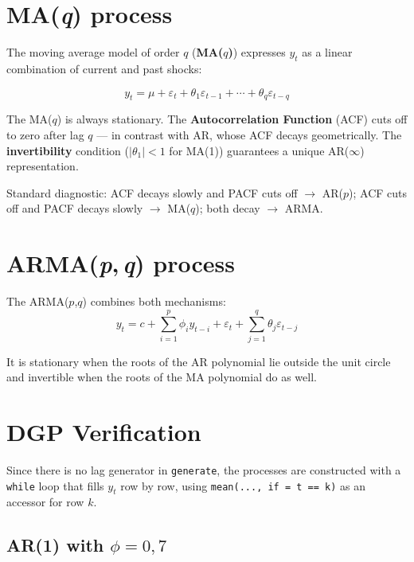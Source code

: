 \section{MA(\textit{q}) process}

The moving average model of order $q$ (\textbf{MA($q$)}) expresses $y_t$
as a linear combination of current and past shocks:

\[
  y_t = \mu + \varepsilon_t + \theta_1 \varepsilon_{t-1}
        + \cdots + \theta_q \varepsilon_{t-q}
\]

The MA($q$) is always stationary. The \textbf{Autocorrelation Function} (ACF)
cuts off to zero after lag $q$ --- in contrast with AR, whose ACF decays
geometrically. The \textbf{invertibility} condition ($|\theta_1| < 1$
for MA(1)) guarantees a unique AR($\infty$) representation.

\begin{nota}
  Standard diagnostic: ACF decays slowly and PACF cuts off $\to$ AR($p$);
  ACF cuts off and PACF decays slowly $\to$ MA($q$); both decay $\to$ ARMA.
\end{nota}

\section{ARMA(\textit{p},\,\textit{q}) process}

The ARMA($p$,$q$) combines both mechanisms:
\[
  y_t = c + \sum_{i=1}^p \phi_i y_{t-i}
        + \varepsilon_t + \sum_{j=1}^q \theta_j \varepsilon_{t-j}
\]

It is stationary when the roots of the AR polynomial lie outside the unit
circle and invertible when the roots of the MA polynomial do as well.

\section{DGP Verification}

Since there is no lag generator in \lstinline{generate}, the processes
are constructed with a \lstinline{while} loop that fills $y_t$ row by
row, using \lstinline{mean(..., if = t == k)} as an accessor for row $k$.

\subsection*{AR(1) with $\phi = 0{,}7$}

